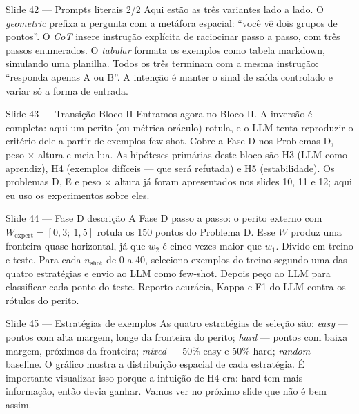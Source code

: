 \documentclass[aspectratio=169,10pt]{beamer}
\begin{document}
\begin{frame}{Slide 42 --- Prompts literais 2/2}
\footnotesize
Aqui est\~ao as tr\^es variantes lado a lado. O \emph{geometric} prefixa a pergunta com a met\'afora espacial: ``voc\^e v\^e dois grupos de pontos''. O \emph{CoT} insere instru\c{c}\~ao expl\'icita de raciocinar passo a passo, com tr\^es passos enumerados. O \emph{tabular} formata os exemplos como tabela markdown, simulando uma planilha. Todos os tr\^es terminam com a mesma instru\c{c}\~ao: ``responda apenas A ou B''. A inten\c{c}\~ao \'e manter o sinal de sa\'ida controlado e variar s\'o a forma de entrada.
\end{frame}

\begin{frame}{Slide 43 --- Transi\c{c}\~ao Bloco II}
\footnotesize
Entramos agora no Bloco II. A invers\~ao \'e completa: aqui um perito (ou m\'etrica or\'aculo) rotula, e o LLM tenta reproduzir o crit\'erio dele a partir de exemplos few-shot. Cobre a Fase D nos Problemas D, peso $\times$ altura e meia-lua. As hip\'oteses prim\'arias deste bloco s\~ao H3 (LLM como aprendiz), H4 (exemplos dif\'iceis --- que ser\'a refutada) e H5 (estabilidade). Os problemas D, E e peso $\times$ altura j\'a foram apresentados nos slides 10, 11 e 12; aqui eu uso os experimentos sobre eles.
\end{frame}

\begin{frame}{Slide 44 --- Fase D descri\c{c}\~ao}
\footnotesize
A Fase D passo a passo: o perito externo com $W_{\text{expert}} = [0{,}3;\ 1{,}5]$ rotula os 150 pontos do Problema D. Esse $W$ produz uma fronteira quase horizontal, j\'a que $w_2$ \'e cinco vezes maior que $w_1$. Divido em treino e teste. Para cada $n_{\text{shot}}$ de 0 a 40, seleciono exemplos do treino segundo uma das quatro estrat\'egias e envio ao LLM como few-shot. Depois pe\c{c}o ao LLM para classificar cada ponto do teste. Reporto acur\'acia, Kappa e F1 do LLM contra os r\'otulos do perito.
\end{frame}

\begin{frame}{Slide 45 --- Estrat\'egias de exemplos}
\footnotesize
As quatro estrat\'egias de sele\c{c}\~ao s\~ao: \emph{easy} --- pontos com alta margem, longe da fronteira do perito; \emph{hard} --- pontos com baixa margem, pr\'oximos da fronteira; \emph{mixed} --- 50\% easy e 50\% hard; \emph{random} --- baseline. O gr\'afico mostra a distribui\c{c}\~ao espacial de cada estrat\'egia. \'E importante visualizar isso porque a intui\c{c}\~ao de H4 era: hard tem mais informa\c{c}\~ao, ent\~ao devia ganhar. Vamos ver no pr\'oximo slide que n\~ao \'e bem assim.
\end{frame}
\end{document}
